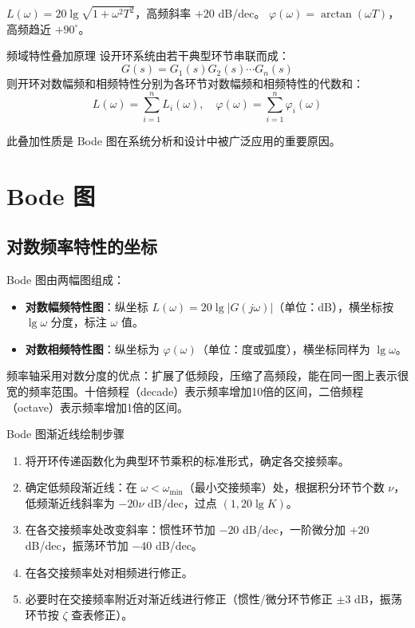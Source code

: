 $L(\omega) = 20\lg\sqrt{1 + \omega^2 T^2}$，高频斜率 $+20$ dB/dec。
$\varphi(\omega) = \arctan(\omega T)$，高频趋近 $+90^{\circ}$。

\begin{myTheorem}{频域特性叠加原理}
设开环系统由若干典型环节串联而成：
\[
G(s) = G_1(s)G_2(s)\cdots G_n(s)
\]
则开环对数幅频和相频特性分别为各环节对数幅频和相频特性的代数和：
\[
L(\omega) = \sum_{i=1}^{n} L_i(\omega),\quad
\varphi(\omega) = \sum_{i=1}^{n} \varphi_i(\omega)
\]
\end{myTheorem}

此叠加性质是 Bode 图在系统分析和设计中被广泛应用的重要原因。

\section{Bode 图}

\subsection{对数频率特性的坐标}

Bode 图由两幅图组成：
\begin{itemize}
    \item \textbf{对数幅频特性图}：纵坐标 $L(\omega) = 20\lg|G(j\omega)|$（单位：dB），横坐标按 $\lg\omega$ 分度，标注 $\omega$ 值。
    \item \textbf{对数相频特性图}：纵坐标为 $\varphi(\omega)$（单位：度或弧度），横坐标同样为 $\lg\omega$。
\end{itemize}

频率轴采用对数分度的优点：扩展了低频段，压缩了高频段，能在同一图上表示很宽的频率范围。十倍频程（decade）表示频率增加10倍的区间，二倍频程（octave）表示频率增加1倍的区间。

\begin{myalgorithm}{Bode 图渐近线绘制步骤}
\begin{enumerate}
    \item 将开环传递函数化为典型环节乘积的标准形式，确定各交接频率。
    \item 确定低频段渐近线：在 $\omega < \omega_{\min}$（最小交接频率）处，根据积分环节个数 $\nu$，低频渐近线斜率为 $-20\nu$ dB/dec，过点 $(1, 20\lg K)$。
    \item 在各交接频率处改变斜率：惯性环节加 $-20$ dB/dec，一阶微分加 $+20$ dB/dec，振荡环节加 $-40$ dB/dec。
    \item 在各交接频率处对相频进行修正。
    \item 必要时在交接频率附近对渐近线进行修正（惯性/微分环节修正 $\pm3$ dB，振荡环节按 $\zeta$ 查表修正）。
\end{enumerate}
\end{myalgorithm}

